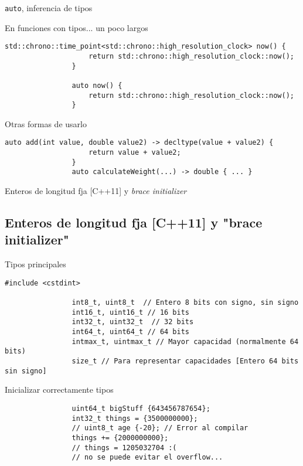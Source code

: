 \documentclass{beamer}
\newcommand{\normalSizeItem}[1] {
  \normalsize{\item #1}
}
\begin{document}
		\begin{frame}[fragile]{\texttt{auto}, inferencia de tipos}	
			\begin{itemize}
			
				\normalSizeItem{En funciones con tipos... un poco largos}
				\begin{lstlisting}[basicstyle={\tiny\ttfamily}]
				std::chrono::time_point<std::chrono::high_resolution_clock> now() {
					return std::chrono::high_resolution_clock::now();
				}
				
				auto now() {
					return std::chrono::high_resolution_clock::now();
				}
				\end{lstlisting}
								
				\normalSizeItem { Otras formas de usarlo }
				\begin{lstlisting}[basicstyle={\tiny\ttfamily}]
				auto add(int value, double value2) -> decltype(value + value2) {
					return value + value2;
				}
				auto calculateWeight(...) -> double { ... }
				\end{lstlisting}
				
			\end{itemize}
		\end{frame}
		
		\begin{frame}[fragile]{Enteros de longitud fja [C++11] y \textit{brace initializer}}	
			\subsection{Enteros de longitud fja [C++11] y "brace initializer"}
			\begin{itemize}
			
				\normalSizeItem{Tipos principales}
				\begin{lstlisting}[basicstyle={\tiny\ttfamily}]
				#include <cstdint>

				int8_t, uint8_t  // Entero 8 bits con signo, sin signo
				int16_t, uint16_t // 16 bits
				int32_t, uint32_t  // 32 bits
				int64_t, uint64_t // 64 bits
				intmax_t, uintmax_t // Mayor capacidad (normalmente 64 bits)
				size_t // Para representar capacidades [Entero 64 bits sin signo]
				\end{lstlisting}
								
				\normalSizeItem { Inicializar correctamente tipos }
				\begin{lstlisting}
				uint64_t bigStuff {643456787654};
				int32_t things = {3500000000};
				// uint8_t age {-20}; // Error al compilar
				things += {2000000000};
				// things = 1205032704 :(
				// no se puede evitar el overflow...
				\end{lstlisting}
				
			\end{itemize}
		\end{frame}
		
\end{document}
